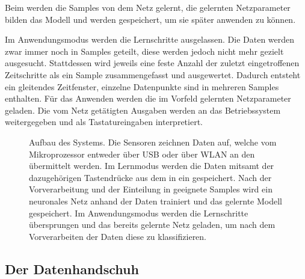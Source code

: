 Beim  werden die Samples von dem Netz gelernt, die gelernten Netzparameter bilden das Modell und werden gespeichert, um sie später anwenden zu können.

Im Anwendungsmodus werden die Lernschritte ausgelassen. Die Daten werden zwar immer noch in Samples geteilt, diese werden jedoch nicht mehr gezielt ausgesucht. Stattdessen wird jeweils eine feste Anzahl der zuletzt eingetroffenen Zeitschritte als ein Sample zusammengefasst und ausgewertet. Dadurch entsteht ein gleitendes Zeitfenster, einzelne Datenpunkte sind in mehreren Samples enthalten. Für das Anwenden werden die im Vorfeld gelernten Netzparameter geladen. Die vom Netz getätigten Ausgaben werden an das Betriebssystem weitergegeben und als Tastatureingaben interpretiert.

\begin{figure}
    \centering
    
    \caption[Aufbau des Systems]{Aufbau des Systems. Die Sensoren zeichnen Daten auf, welche vom Mikroprozessor entweder über USB oder über WLAN an den  übermittelt werden. Im Lernmodus werden die Daten mitsamt der dazugehörigen Tastendrücke aus dem  in ein  gespeichert. Nach der Vorverarbeitung und der Einteilung in geeignete Samples wird ein neuronales Netz anhand der Daten trainiert und das gelernte Modell gespeichert. Im Anwendungsmodus werden die Lernschritte übersprungen und das bereits gelernte Netz geladen, um nach dem Vorverarbeiten der Daten diese zu klassifizieren.}
\end{figure}

\subsection{Der Datenhandschuh}

